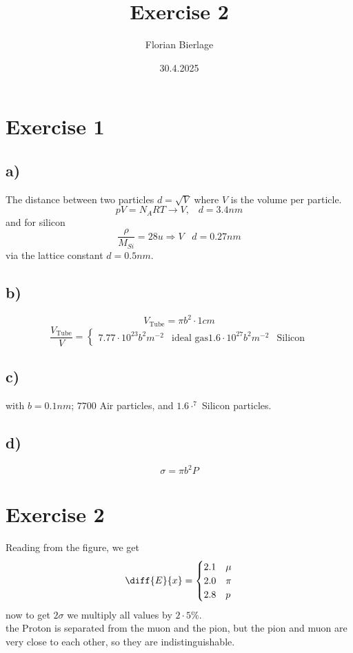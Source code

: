 \documentclass[]{scrartcl}
\title{Exercise 2}
\author{Florian Bierlage}
\date{30.4.2025}
\begin{document}
\maketitle
\newpage
\tableofcontents
\newpage

\section{Exercise 1}
\subsection{a)}

The distance between two particles $d = \sqrt{V}$ where $V$ is the volume per particle.
$$
pV = N_A RT \rightarrow V, \;\;\; d= 3.4nm
$$
and for silicon
$$
\frac{\rho}{M_{Si}}=28u \Rightarrow V\;\;\; d = 0.27nm
$$
via the lattice constant $d = 0.5nm$.

\subsection{b)}
$$
V_{\text{Tube}} = \pi b^2 \cdot 1cm
$$
$$
\frac{V_\text{Tube}}{V} = 
\begin{cases}
	7.77\cdot 10^{23}b^2 m^{-2} & \text{ideal gas}
	1.6\cdot10^{27}b^2 m^{-2} & \text{Silicon}
\end{cases}
$$

\subsection{c)}

with $b=0.1nm$; $7700$ Air particles, and $1.6\cdot^{7}$ Silicon particles.

\subsection{d)}

$$
\sigma = \pi b^2 P
$$

\section{Exercise 2}

Reading from the figure, we get
$$
\diff{E}{x}=
\begin{cases}
	2.1 & \mu 	\\
	2.0 & \pi 	\\
	2.8 & p		\\
\end{cases}
$$
now to get $2\sigma$ we multiply all values by $2\cdot 5\%$.\\
the Proton is separated from the muon and the pion, but the pion and muon are very close to each other, so they are indistinguishable.
\end{document}
